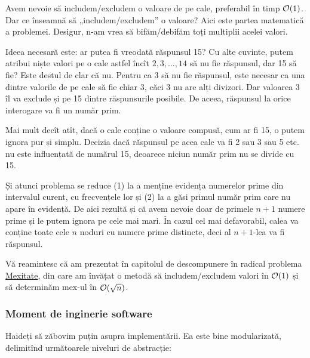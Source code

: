 \documentclass[../main.tex]{subfiles}
\begin{document}
Avem nevoie să includem/excludem o valoare de pe cale, preferabil în timp $\mathcal{O}(1)$. Dar ce înseamnă să „includem/excludem” o valoare? Aici este partea matematică a problemei. Desigur, n-am vrea să bifăm/debifăm toți multiplii acelei valori.

Ideea necesară este: ar putea fi vreodată răspunsul 15? Cu alte cuvinte, putem atribui niște valori pe o cale astfel încît $2, 3, \dots, 14$ să nu fie răspunsul, dar 15 să fie? Este destul de clar că nu. Pentru ca 3 să nu fie răspunsul, este necesar ca una dintre valorile de pe cale să fie chiar 3, căci 3 nu are alți divizori. Dar valoarea 3 îl va exclude și pe 15 dintre răspunsurile posibile. De aceea, răspunsul la orice interogare va fi un număr prim.

Mai mult decît atît, dacă o cale conține o valoare compusă, cum ar fi 15, o putem ignora pur și simplu. Decizia dacă răspunsul pe acea cale va fi 2 sau 3 sau 5 etc. nu este influențată de numărul 15, deoarece niciun număr prim nu se divide cu 15.

Și atunci problema se reduce (1) la a menține evidența numerelor prime din intervalul curent, cu frecvențele lor și (2) la a găsi primul număr prim care nu apare în evidență. De aici rezultă și că avem nevoie doar de primele $n+1$ numere prime și le putem ignora pe cele mai mari. În cazul cel mai defavorabil, calea va conține toate cele $n$ noduri cu numere prime distincte, deci al $n+1$-lea va fi răspunsul.

Vă reamintesc că am prezentat în capitolul de descompunere în radical problema \hyperref[problem:mexitate]{Mexitate}, din care am învățat o metodă să includem/excludem valori în $\mathcal{O}(1)$ și să determinăm mex-ul în $\mathcal{O}(\sqrt{n})$.

\subsubsection*{Moment de inginerie software}

Haideți să zăbovim puțin asupra implementării. Ea este bine modularizată, delimitînd următoarele niveluri de abstracție:
\end{document}
